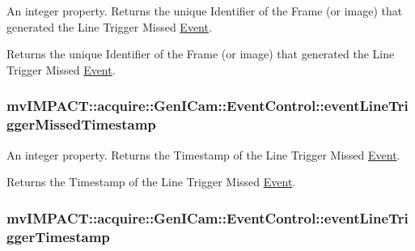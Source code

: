 An integer property. Returns the unique Identifier of the Frame (or image) that generated the Line Trigger Missed \hyperlink{classmv_i_m_p_a_c_t_1_1acquire_1_1_event}{Event}. 

Returns the unique Identifier of the Frame (or image) that generated the Line Trigger Missed \hyperlink{classmv_i_m_p_a_c_t_1_1acquire_1_1_event}{Event}. \hypertarget{classmv_i_m_p_a_c_t_1_1acquire_1_1_gen_i_cam_1_1_event_control_ae782caab71ec3f11cc9f9cbebc56c87d}{
\subsubsection[{event\+Line\+Trigger\+Missed\+Timestamp}]{ mv\+I\+M\+P\+A\+C\+T\+::acquire\+::\+Gen\+I\+Cam\+::\+Event\+Control\+::event\+Line\+Trigger\+Missed\+Timestamp}}\label{classmv_i_m_p_a_c_t_1_1acquire_1_1_gen_i_cam_1_1_event_control_ae782caab71ec3f11cc9f9cbebc56c87d}


An integer property. Returns the Timestamp of the Line Trigger Missed \hyperlink{classmv_i_m_p_a_c_t_1_1acquire_1_1_event}{Event}. 

Returns the Timestamp of the Line Trigger Missed \hyperlink{classmv_i_m_p_a_c_t_1_1acquire_1_1_event}{Event}. \hypertarget{classmv_i_m_p_a_c_t_1_1acquire_1_1_gen_i_cam_1_1_event_control_afd63d96889fbd4e5201bb15528bd9c90}{
\subsubsection[{event\+Line\+Trigger\+Timestamp}]{ mv\+I\+M\+P\+A\+C\+T\+::acquire\+::\+Gen\+I\+Cam\+::\+Event\+Control\+::event\+Line\+Trigger\+Timestamp}}\label{classmv_i_m_p_a_c_t_1_1acquire_1_1_gen_i_cam_1_1_event_control_afd63d96889fbd4e5201bb15528bd9c90}


